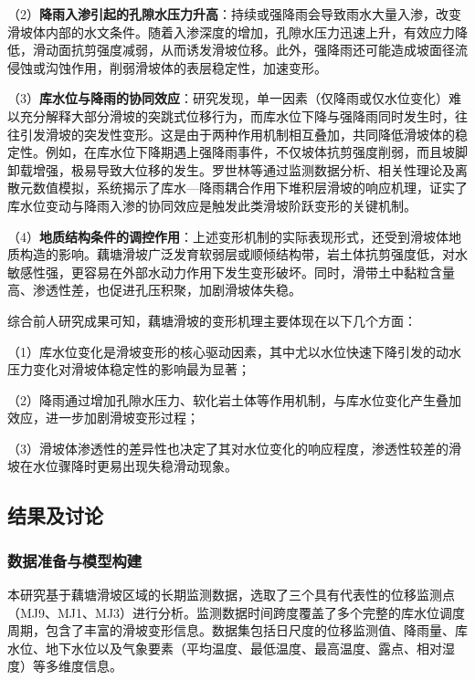 \documentclass[12pt,a4paper]{article}
\begin{document}
    （2）\textbf{降雨入渗引起的孔隙水压力升高}：持续或强降雨会导致雨水大量入渗，改变滑坡体内部的水文条件。随着入渗深度的增加，孔隙水压力迅速上升，有效应力降低，滑动面抗剪强度减弱，从而诱发滑坡位移。此外，强降雨还可能造成坡面径流侵蚀或沟蚀作用，削弱滑坡体的表层稳定性，加速变形。

    （3）\textbf{库水位与降雨的协同效应}：研究发现，单一因素（仅降雨或仅水位变化）难以充分解释大部分滑坡的突跳式位移行为，而库水位下降与强降雨同时发生时，往往引发滑坡的突发性变形。这是由于两种作用机制相互叠加，共同降低滑坡体的稳定性。例如，在库水位下降期遇上强降雨事件，不仅坡体抗剪强度削弱，而且坡脚卸载增强，极易导致大位移的发生。罗世林等\cite{luo2024response}通过监测数据分析、相关性理论及离散元数值模拟，系统揭示了库水—降雨耦合作用下堆积层滑坡的响应机理，证实了库水位变动与降雨入渗的协同效应是触发此类滑坡阶跃变形的关键机制。

    （4）\textbf{地质结构条件的调控作用}：上述变形机制的实际表现形式，还受到滑坡体地质构造的影响。藕塘滑坡广泛发育软弱层或顺倾结构带，岩土体抗剪强度低，对水敏感性强，更容易在外部水动力作用下发生变形破坏。同时，滑带土中黏粒含量高、渗透性差，也促进孔压积聚，加剧滑坡体失稳。

综合前人研究成果可知，藕塘滑坡的变形机理主要体现在以下几个方面：

    （1）库水位变化是滑坡变形的核心驱动因素，其中尤以水位快速下降引发的动水压力变化对滑坡体稳定性的影响最为显著；

    （2）降雨通过增加孔隙水压力、软化岩土体等作用机制，与库水位变化产生叠加效应，进一步加剧滑坡变形过程；

    （3）滑坡体渗透性的差异性也决定了其对水位变化的响应程度，渗透性较差的滑坡在水位骤降时更易出现失稳滑动现象。

\subsection{结果及讨论}

\subsubsection{数据准备与模型构建}

本研究基于藕塘滑坡区域的长期监测数据，选取了三个具有代表性的位移监测点（MJ9、MJ1、MJ3）进行分析。监测数据时间跨度覆盖了多个完整的库水位调度周期，包含了丰富的滑坡变形信息。数据集包括日尺度的位移监测值、降雨量、库水位、地下水位以及气象要素（平均温度、最低温度、最高温度、露点、相对湿度）等多维度信息。
\end{document}
